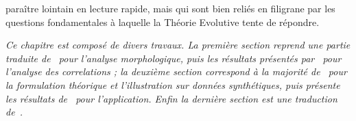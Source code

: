 paraître lointain en lecture rapide, mais qui sont bien reliés en filigrane par les questions fondamentales à laquelle la Théorie Evolutive tente de répondre.




\stars


\textit{Ce chapitre est composé de divers travaux. La première section reprend une partie traduite de~\cite{} pour l'analyse morphologique, puis les résultats présentés par~\cite{raimbault2016cautious} pour l'analyse des correlations ; la deuxième section correspond à la majorité de~\cite{} pour la formulation théorique et l'illustration sur données synthétiques, puis présente les résultats de~\cite{} pour l'application. Enfin la dernière section est une traduction de~\cite{}.}



















